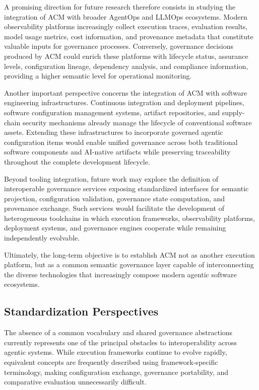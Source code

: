 \documentclass[10pt]{article}
\begin{document}
A promising direction for future research therefore consists in studying the integration of ACM with broader AgentOps and LLMOps ecosystems. Modern observability platforms increasingly collect execution traces, evaluation results, model usage metrics, cost information, and provenance metadata that constitute valuable inputs for governance processes. Conversely, governance decisions produced by ACM could enrich these platforms with lifecycle status, assurance levels, configuration lineage, dependency analysis, and compliance information, providing a higher semantic level for operational monitoring.

Another important perspective concerns the integration of ACM with software engineering infrastructures. Continuous integration and deployment pipelines, software configuration management systems, artifact repositories, and supply-chain security mechanisms already manage the lifecycle of conventional software assets. Extending these infrastructures to incorporate governed agentic configuration items would enable unified governance across both traditional software components and AI-native artifacts while preserving traceability throughout the complete development lifecycle.

Beyond tooling integration, future work may explore the definition of interoperable governance services exposing standardized interfaces for semantic projection, configuration validation, governance state computation, and provenance exchange. Such services would facilitate the development of heterogeneous toolchains in which execution frameworks, observability platforms, deployment systems, and governance engines cooperate while remaining independently evolvable.

Ultimately, the long-term objective is to establish ACM not as another execution platform, but as a common semantic governance layer capable of interconnecting the diverse technologies that increasingly compose modern agentic software ecosystems.

\subsection{Standardization Perspectives}
\label{sec:future_standardization}

The absence of a common vocabulary and shared governance abstractions currently represents one of the principal obstacles to interoperability across agentic systems. While execution frameworks continue to evolve rapidly, equivalent concepts are frequently described using framework-specific terminology, making configuration exchange, governance portability, and comparative evaluation unnecessarily difficult.
\end{document}
